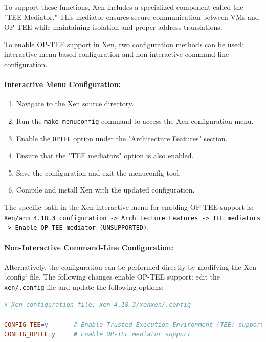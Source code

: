 \documentclass[acmtog]{acmart}
\begin{document}
To support these functions, Xen includes a specialized component called the "TEE Mediator." This mediator ensures secure communication between VMs and OP-TEE while maintaining isolation and proper address translations.

To enable OP-TEE support in Xen, two configuration methods can be used: interactive menu-based configuration and non-interactive command-line configuration.

\paragraph{Interactive Menu Configuration:}
\begin{enumerate}
    \item Navigate to the Xen source directory.
    \item Run the \texttt{make menuconfig} command to access the Xen configuration menu.
    \item Enable the \texttt{OPTEE} option under the "Architecture Features" section.
    \item Ensure that the "TEE mediators" option is also enabled.
    \item Save the configuration and exit the menuconfig tool.
    \item Compile and install Xen with the updated configuration.
\end{enumerate}

The specific path in the Xen interactive menu for enabling OP-TEE support is:
\texttt{Xen/arm 4.18.3 configuration -> Architecture Features -> TEE mediators -> Enable OP-TEE mediator (UNSUPPORTED)}.

\paragraph{Non-Interactive Command-Line Configuration:}
Alternatively, the configuration can be performed directly by modifying the Xen `.config` file. The following changes enable OP-TEE support: edit the \texttt{xen/.config} file and update the following options:

\begin{lstlisting}[language=make, caption=Enable OP-TEE Support in Xen Configuration]
# Xen configuration file: xen-4.18.3/xenxen/.config

CONFIG_TEE=y       # Enable Trusted Execution Environment (TEE) support
CONFIG_OPTEE=y     # Enable OP-TEE mediator support
\end{lstlisting}
\end{document}
